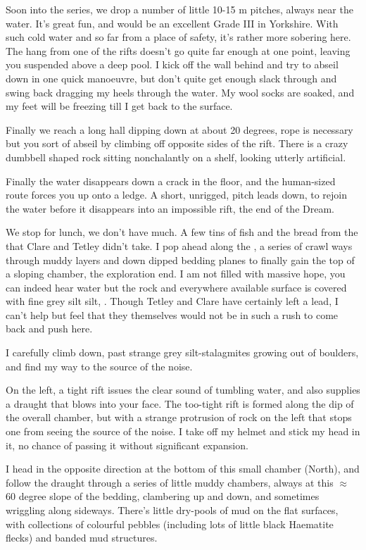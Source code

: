 Soon into the  series, we drop a number of little 10-15 m pitches,
always near the water. It's great fun, and would be an excellent Grade
III in Yorkshire. With such cold water and so far from a place of
safety, it's rather more sobering here. The hang from one of the rifts
doesn't go quite far enough at one point, leaving you suspended above a
deep pool. I kick off the wall behind and try to abseil down in one
quick manoeuvre, but don't quite get enough slack through and swing back
dragging my heels through the water. My wool socks are soaked, and my
feet will be freezing till I get back to the surface.

Finally we reach a long hall dipping down at about 20 degrees, rope is
necessary but you sort of abseil by climbing off opposite sides of the
rift. There is a crazy dumbbell shaped rock sitting nonchalantly on a
shelf, looking utterly artificial.

Finally the water disappears down a crack in the floor, and the
human-sized route forces you up onto a ledge. A short, unrigged, pitch
leads down, to rejoin the water before it disappears into an impossible
rift, the end of the Dream.

We stop for lunch, we don't have much. A few tins of fish and the bread
from the  that Clare and Tetley didn't take. I pop ahead along the
, a series of crawl ways through muddy layers and down
dipped bedding planes to finally gain the top of a sloping chamber, the
exploration end. I am not filled with massive hope, you can indeed hear
water but the rock and everywhere available surface is covered with fine
grey silt silt, . Though Tetley and
Clare have certainly left a lead, I can't help but feel that they
themselves would not be in such a rush to come back and push here.

I carefully climb down, past strange grey silt-stalagmites growing out
of boulders, and find my way to the source of the noise.

On the left, a tight rift issues the clear sound of tumbling water, and
also supplies a draught that blows into your face. The too-tight rift is
formed along the dip of the overall chamber, but with a strange
protrusion of rock on the left that stops one from seeing the source of
the noise. I take off my helmet and stick my head in it, no chance of
passing it without significant expansion.

I head in the opposite direction at the bottom of this small chamber
(North), and follow the draught through a series of little muddy
chambers, always at this $\approx$ 60 degree slope of the bedding,
clambering up and down, and sometimes wriggling along sideways. There's
little dry-pools of mud on the flat surfaces, with collections of
colourful pebbles (including lots of little black Haematite flecks) and
banded mud structures.

